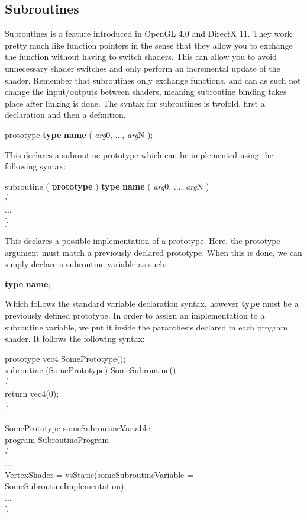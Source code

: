 \documentclass{article}
\newcommand{\SyntaxBox}[1]
{	
	\begin{center}
	\colorbox{orange!60}
	{
		\begin{minipage}{\linewidth}
		\hfill
		\begin{tabbing}
		#1
		\end{tabbing}
		\end{minipage}
	}
	\end{center}
}
\begin{document}
\subsection{Subroutines}
\label{sec:subroutines}
Subroutines is a feature introduced in OpenGL 4.0 and DirectX 11. They work pretty much like function pointers in the sense that they allow you  to exchange the function without having to switch shaders. This can allow you to avoid unnecessary shader switches and only perform an incremental update of the shader. Remember that subroutines only exchange functions, and can as such not change the input/outputs between shaders, meaning subroutine binding takes place after linking is done. The syntax for subroutines is twofold, first a declaration and then a definition.

\SyntaxBox
{
	prototype  \textbf{type} \textbf{name} ( \textit{arg}0, ..., \textit{arg}N );
}

This declares a subroutine prototype which can be implemented using the following syntax:

\SyntaxBox
{
	subroutine ( \textbf{prototype} ) \textbf{type} \textbf{name} ( \textit{arg}0, ..., \textit{arg}N ) \\
	\{ \\
		... \\
	\}
}

This declares a possible implementation of a prototype. Here, the prototype argument must match a previously declared prototype. When this is done, we can simply declare a subroutine variable as such:

\SyntaxBox
{
	\textbf{type} \textbf{name};
}

Which follows the standard variable declaration syntax, however \textbf{type} must be a previously defined prototype. In order to assign an implementation to a subroutine variable, we put it inside the paranthesis declared in each program shader. It follows the following syntax:

\SyntaxBox
{
	prototype vec4 SomePrototype(); \\
	subroutine (SomePrototype) SomeSubroutine() \\
	\{ \= \\
	\>	return vec4(0); \\
	\} \\
	\\
	SomePrototype someSubroutineVariable; \\
	program SubroutineProgram \\
	\{ \= \\
	\>	... \\
	\>	VertexShader = vsStatic(someSubroutineVariable = SomeSubroutineImplementation); \\
	\>	... \\
	\}
}
\end{document}

